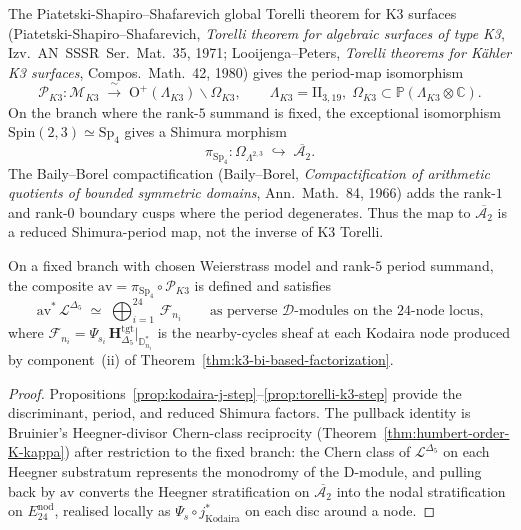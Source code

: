 \begin{proposition}
\label{prop:torelli-k3-step}
The Piatetski-Shapiro--Shafarevich global Torelli theorem for K3 surfaces (Piatetski-Shapiro--Shafarevich, \emph{Torelli theorem for algebraic surfaces of type K3}, Izv.~AN~SSSR~Ser.~Mat.~35, 1971; Looijenga--Peters, \emph{Torelli theorems for K\"ahler K3 surfaces}, Compos.~Math.~42, 1980) gives the period-map isomorphism
\[
 \mathscr{P}_{K3}\colon
 \mathcal{M}_{K3}
 \;\xrightarrow{\;\sim\;}\;
 \mathrm{O}^+(\Lambda_{K3})\backslash\Omega_{K3},
 \qquad
 \Lambda_{K3} = \mathrm{II}_{3,19},\;
 \Omega_{K3}\subset \mathbb{P}(\Lambda_{K3}\otimes\mathbb{C}).
\]
On the branch where the rank-\(5\) summand is fixed, the exceptional isomorphism \(\mathrm{Spin}(2,3)\simeq \mathrm{Sp}_4\) gives a Shimura morphism
\[
 \pi_{\mathrm{Sp}_4}\colon
 \Omega_{\Lambda^{2,3}}
 \;\hookrightarrow\;
 \overline{\mathcal{A}_2}.
\]
The Baily--Borel compactification (Baily--Borel, \emph{Compactification of arithmetic quotients of bounded symmetric domains}, Ann.~Math.~84, 1966) adds the rank-$1$ and rank-$0$ boundary cusps where the period degenerates. Thus the map to \(\overline{\mathcal A_2}\) is a reduced Shimura-period map, not the inverse of K3 Torelli.
\end{proposition}

\begin{corollary}
\label{cor:averaging-morphism-compat-k3}
On a fixed branch with chosen Weierstrass model and rank-\(5\) period summand, the composite $\mathrm{av}=\pi_{\mathrm{Sp}_4}\circ\mathscr{P}_{K3}$ is defined and satisfies
\[
 \mathrm{av}^*\,\mathcal{L}^{\Delta_5}
 \;\simeq\;
 \bigoplus_{i=1}^{24}\,\mathcal{F}_{n_i}
 \qquad
 \text{as perverse $\mathcal{D}$-modules on the $24$-node locus,}
\]
where
$\mathcal{F}_{n_i}=\Psi_{s_i}\,\mathbf{H}_{\Delta_5}^{\mathrm{tgt}}|_{\mathbb{D}^*_{n_i}}$
is the nearby-cycles sheaf at each Kodaira node produced by component~(ii)
of Theorem~\ref{thm:k3-bi-based-factorization}.
\end{corollary}

\begin{proof}
Propositions~\ref{prop:kodaira-j-step}--\ref{prop:torelli-k3-step} provide the discriminant, period, and reduced Shimura factors. The pullback identity is Bruinier's Heegner-divisor Chern-class reciprocity (Theorem~\ref{thm:humbert-order-K-kappa}) after restriction to the fixed branch: the Chern class of $\mathcal{L}^{\Delta_5}$ on each Heegner substratum represents the monodromy of the D-module, and pulling back by $\mathrm{av}$ converts the Heegner stratification on $\overline{\mathcal{A}_2}$ into the nodal stratification on $E^{\mathrm{nod}}_{24}$, realised locally as $\Psi_s\circ j_{\mathrm{Kodaira}}^*$ on each disc around a node.
\end{proof}

